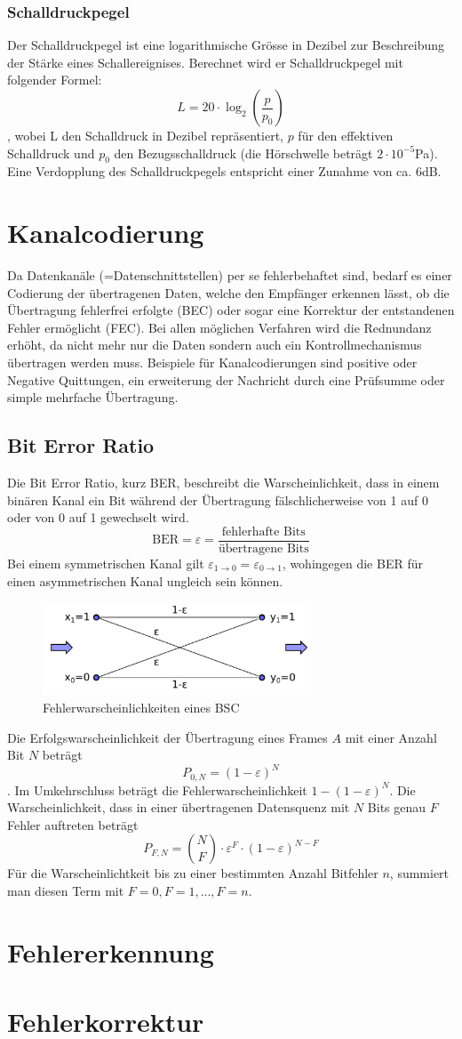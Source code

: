 \documentclass{article}
\begin{document}
\subsubsection{Schalldruckpegel}
Der Schalldruckpegel ist eine logarithmische Grösse in Dezibel zur Beschreibung der Stärke eines Schallereignises. Berechnet wird er Schalldruckpegel mit folgender Formel: 
$$L = 20 \cdot \log_{2}( \frac{p}{p_0} )$$
, wobei L den Schalldruck in Dezibel repräsentiert, $p$ für den effektiven Schalldruck und $p_0$ den Bezugsschalldruck (die Hörschwelle beträgt $2\cdot 10^{-5}$Pa). Eine Verdopplung des Schalldruckpegels entspricht einer Zunahme von ca. 6dB.
\section{Kanalcodierung}
Da Datenkanäle (=Datenschnittstellen) per se fehlerbehaftet sind, bedarf es einer Codierung der übertragenen Daten, welche den Empfänger erkennen lässt, ob die Übertragung fehlerfrei erfolgte (BEC) oder sogar eine Korrektur der entstandenen Fehler ermöglicht (FEC). Bei allen möglichen Verfahren wird die Rednundanz erhöht, da nicht mehr nur die Daten sondern auch ein Kontrollmechanismus übertragen werden muss. Beispiele für Kanalcodierungen sind positive oder Negative Quittungen, ein erweiterung der Nachricht durch eine Prüfsumme oder simple mehrfache Übertragung. 
\subsection{Bit Error Ratio}
Die Bit Error Ratio, kurz BER, beschreibt die Warscheinlichkeit, dass in einem binären Kanal ein Bit während der Übertragung fälschlicherweise von 1 auf 0 oder von 0 auf 1 gewechselt wird. 
$$\textrm{BER} = \varepsilon = \frac{\textrm{fehlerhafte Bits}}{\textrm{übertragene Bits}} $$
Bei einem symmetrischen Kanal gilt $\varepsilon_{1\to0} = \varepsilon_{0\to 1}$, wohingegen die BER für einen asymmetrischen Kanal ungleich sein können.
\begin{figure}[h]
		\begin{center}
		\includegraphics[width=8cm]{img/bsc_error.png}
		\end{center}
		\caption{Fehlerwarscheinlichkeiten eines BSC}
		\label{fig:Fehlerwarscheinlichkeiten eines BSC}
\end{figure}
Die Erfolgswarscheinlichkeit der Übertragung eines Frames $A$ mit einer Anzahl Bit $N$ beträgt $$P_{0,N} = (1-\varepsilon)^{N}$$. Im Umkehrschluss beträgt die Fehlerwarscheinlichkeit $1-(1-\varepsilon)^{N}$.
Die Warscheinlichkeit, dass in einer übertragenen Datensquenz mit $N$ Bits genau $F$ Fehler auftreten beträgt $$P_{F,N} = \binom{N}{F}\cdot \varepsilon^{F}\cdot(1-\varepsilon)^{N-F}$$
Für die Warscheinlichtkeit bis zu einer bestimmten Anzahl Bitfehler $n$, summiert man diesen Term mit $F=0, F=1, ..., F=n$.
\section{Fehlererkennung}
\section{Fehlerkorrektur}
\end{document}
